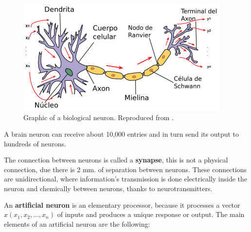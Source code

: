  \begin{figure}[h!]
  \begin{center}	\includegraphics[width=0.95\textwidth, frame]{imagenes/Cap4/neurona}
  \caption{Graphic of a biological neuron. Reproduced from \protect\cite{Reference67}.}
  \label{fig:neurona_real}
  \end{center}
\end{figure}

A brain neuron can receive about 10,000 entries and in turn send its output to hundreds of neurons.

\vspace{5mm} %

The connection between neurons is called a \textbf{synapse}, this is not a physical connection, due there is 2 mm. of separation between neurons. These connections are unidirectional, where information's transmission is done electrically inside the neuron and chemically between neurons, thanks to neurotransmitters.

\vspace{5mm} %

An \textbf{artificial neuron} is an elementary processor, because it processes a vector $x(x_{1},x_{2}, ... ,x_{n})$ of inputs and produces a unique response or output. The main elements of an artificial neuron are the following:

